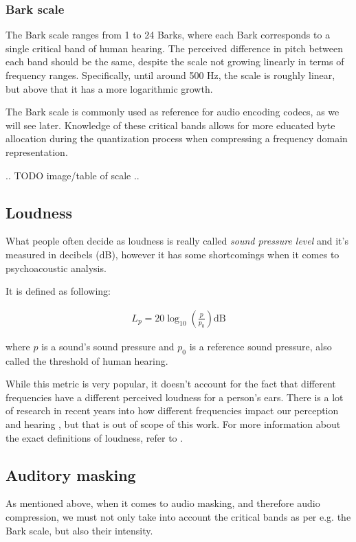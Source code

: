 \subsubsection{Bark scale}
The Bark scale ranges from 1 to 24 Barks, where each Bark corresponds to a single critical band of human hearing. \cite{fastl_2006} The perceived difference in pitch between each band should be the same, despite the scale not growing linearly in terms of frequency ranges. Specifically, until around 500 Hz, the scale is roughly linear, but above that it has a more logarithmic growth. \cite{hermes_filter}

The Bark scale is commonly used as reference for audio encoding codecs, as we will see later. Knowledge of these critical bands allows for more educated byte allocation during the quantization process when compressing a frequency domain representation.

.. TODO image/table of scale ..

\subsection{Loudness}
What people often decide as loudness is really called \emph{sound pressure level} and it's measured in decibels (dB), however it has some shortcomings when it comes to psychoacoustic analysis.

It is defined as following: \cite{behar_1984}

\begin{align}
L_p = 20 \log_{10} \left( \frac{p}{p_0} \right) \text{dB}
\end{align}

where $p$ is a sound's sound pressure and $p_0$ is a reference sound pressure, also called the threshold of human hearing.

While this metric is very popular, it doesn't account for the fact that different frequencies have a different perceived loudness for a person's ears. \cite{olson1967music} There is a lot of research in recent years into how different frequencies impact our perception and hearing \cite{kuwano_1989}, but that is out of scope of this work. For more information about the exact definitions of loudness, refer to \cite{olson1967music}.

\subsection{Auditory masking}
As mentioned above, when it comes to audio masking, and therefore audio compression, we must not only take into account the critical bands as per e.g. the Bark scale, but also their intensity.

